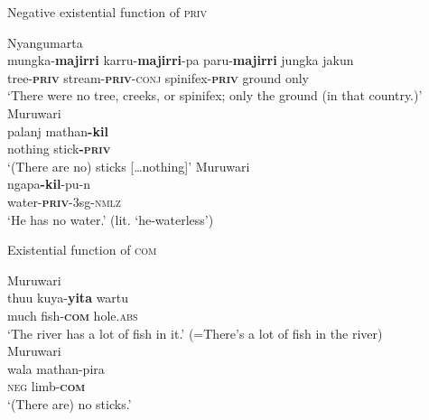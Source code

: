 \documentclass[output=paper,draft,draftmode,colorlinks,citecolor=brown]{langscibook}
\begin{document}
    \begin{exe}\ex\label{ex:austr-negex-function-priv} Negative existential function of \textsc{priv}
    \begin{xlist}
\ex
        \label{ex:austr-negex-function-priv-nyang}
        Nyangumarta\\
\gll mungka-\textbf{majirri} karru-\textbf{majirri}-pa paru-\textbf{majirri} jungka jakun \\
tree\textsc{-\textbf{priv}} stream\textsc{-\textbf{priv}-conj} spinifex\textsc{-\textbf{priv}} ground only\\
\glt `There were no tree, creeks, or spinifex; only the ground (in that country.)'
%
        \ex\label{ex:austr-negex-function-priv-muru} Muruwari\\
\gll  palanj mathan\textbf{-kil}\\
nothing stick\textbf{-\textsc{priv}}\\
\glt `(There are no) sticks [\ldots{}nothing]'
%
\ex\label{ex:austr-negex-function-priv-muru-water} Muruwari\\
\gll  ngapa\textbf{-kil}-pu-n\\
water-\textbf{\textsc{priv}}-3sg-\textsc{nmlz}\\
\glt `He has no water.' (lit. `he-waterless') 
    \end{xlist}
%
\ex\label{ex:austr-exist-function-comit} 
    Existential function of \textsc{com}
\begin{xlist}
    \ex Muruwari \\
	\gll thuu kuya-\textbf{yita} wartu\\
	much fish-\textsc{\textbf{com}} hole.\textsc{abs}\\
	\glt `The river has a lot of fish in it.' (=There's a lot of fish in
            the river) \\
    \ex\label{ex:austr-exist-function-comit-sticks} Muruwari \\
    \gll wala mathan-pira\\
	\textsc{neg} limb-\textbf{\textsc{com}}\\
    \glt `(There are) no sticks.'
        \end{xlist}\end{exe}
\end{document}
